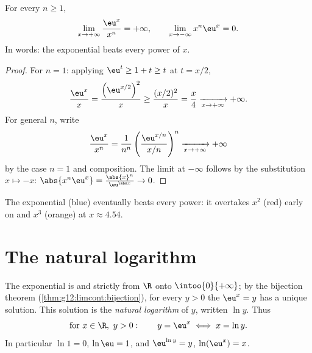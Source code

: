 \begin{theorem}\label{thm:g12:exp:growth}
For every  $n \geq 1$,
\[
\lim_{x\to+\infty} \frac{\eu^x}{x^n} = +\infty,
\qquad
\lim_{x\to-\infty} x^n \eu^x = 0 .
\]
In words: the exponential beats every power of $x$.
\end{theorem}

\begin{proof}
For $n = 1$: applying $\eu^t \geq 1 + t \geq t$ at $t = x/2$,
\[
\frac{\eu^x}{x} = \frac{\left(\eu^{x/2}\right)^2}{x}
\geq \frac{(x/2)^2}{x} = \frac{x}{4} \xrightarrow[x\to+\infty]{} +\infty .
\]
For general $n$, write
\[
\frac{\eu^x}{x^n}
= \frac{1}{n^n}\left(\frac{\eu^{x/n}}{x/n}\right)^{n}
\xrightarrow[x\to+\infty]{} +\infty
\]
by the case $n=1$ and composition. The limit at $-\infty$ follows by the
substitution $x \mapsto -x$:
$\abs{x^n \eu^x} = \frac{\abs{x}^n}{\eu^{\abs x}} \to 0$.
\end{proof}

\begin{omfigure}

{\small The exponential (blue) eventually beats every power: it
overtakes $x^2$ (red) early on and $x^3$ (orange) at $x \approx 4.54$.}
\end{omfigure}

\section{The natural logarithm}

\begin{definition}\label{def:g12:exp:ln}
The exponential is  and strictly  from $\R$ onto
$\intoo{0}{+\infty}$; by the bijection theorem
(\cref{thm:g12:limcont:bijection}), for every $y > 0$ the 
$\eu^x = y$ has a unique solution. This solution is the \emph{natural
logarithm} of $y$, written $\ln y$. Thus
\[
\text{for } x \in \R,\ y > 0: \qquad y = \eu^x \iff x = \ln y .
\]
In particular $\ln 1 = 0$, $\ln \eu = 1$, and
$\eu^{\ln y} = y$, $\ln(\eu^x) = x$.
\end{definition}


